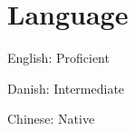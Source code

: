 \section{Language}
\hspace{1em}
\begin{minipage}{0.3\textwidth}
	English: {\hfill {\small{Proficient}}}\\
\end{minipage}
\hspace{1em}
\begin{minipage}{0.3\textwidth}
	Danish: {\hfill {\small{Intermediate}}}\\
\end{minipage}
\hspace{1em}
\begin{minipage}{0.3\textwidth}
	Chinese: {\hfill {\small{Native}}}\\
\end{minipage}